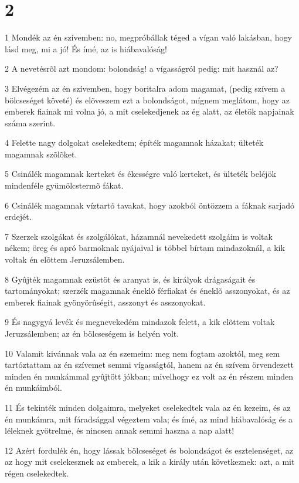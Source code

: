 \chapter{2}

\par 1 Mondék az én szívemben: no, megpróbállak téged a vígan való lakásban, hogy lásd meg, mi a jó! És ímé, az is hiábavalóság!
\par 2 A nevetésrõl azt mondom: bolondság! a vígasságról pedig: mit használ az?
\par 3 Elvégezém az én szívemben, hogy boritalra adom magamat, (pedig szívem a bölcseséget követé) és elõveszem ezt a bolondságot, mígnem meglátom, hogy az emberek fiainak mi volna jó, a mit cselekedjenek az ég alatt, az életök napjainak száma szerint.
\par 4 Felette nagy dolgokat cselekedtem; építék magamnak házakat; ülteték magamnak szõlõket.
\par 5 Csinálék magamnak kerteket és ékességre való kerteket, és ülteték beléjök mindenféle gyümölcstermõ fákat.
\par 6 Csinálék magamnak víztartó tavakat, hogy azokból öntözzem a fáknak sarjadó erdejét.
\par 7 Szerzek szolgákat és szolgálókat, házamnál nevekedett szolgáim is voltak nékem; öreg és apró barmoknak nyájaival is többel bírtam mindazoknál, a kik voltak én elõttem Jeruzsálemben.
\par 8 Gyûjték magamnak ezüstöt  és aranyat is, és királyok drágaságait és tartományokat; szerzék magamnak éneklõ férfiakat és éneklõ asszonyokat, és az emberek fiainak gyönyörûségit, asszonyt és asszonyokat.
\par 9 És nagygyá levék és megnevekedém mindazok felett, a kik elõttem voltak Jeruzsálemben; az én bölcseségem is helyén volt.
\par 10 Valamit kivánnak vala az én szemeim: meg nem fogtam azoktól, meg sem tartóztattam az én szívemet semmi vígasságtól, hanem az én szívem örvendezett minden én munkámmal gyûjtött jókban; mivelhogy ez volt az én részem minden én munkáimból.
\par 11 És tekinték minden dolgaimra, melyeket cselekedtek vala az én kezeim, és az én munkámra, mit fáradsággal végeztem vala; és ímé, az mind hiábavalóság és a léleknek gyötrelme, és nincsen annak semmi haszna a nap alatt!
\par 12 Azért fordulék én, hogy lássak bölcseséget és bolondságot és esztelenséget, az az hogy mit cselekesznek az emberek, a kik a király után következnek: azt, a mit régen cselekedtek.
